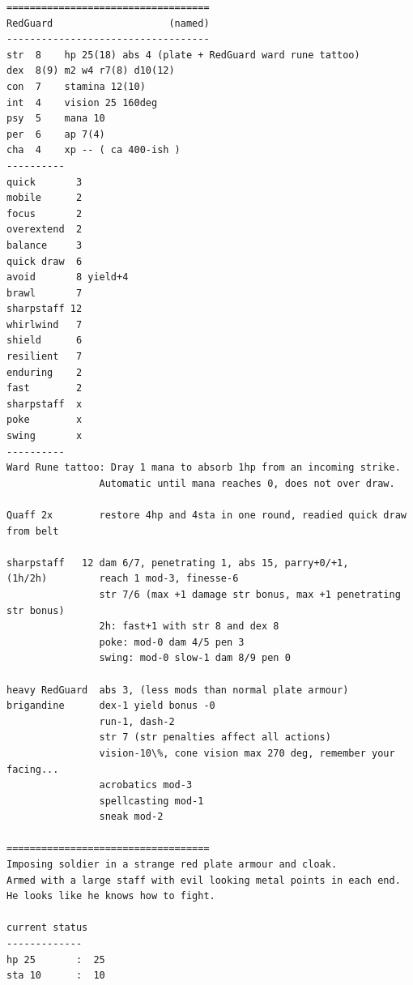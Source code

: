 \documentclass[11pt, twoside, titlepage, a4paper]{report}
\begin{document}
\small \begin{verbatim}
===================================
RedGuard                    (named)
-----------------------------------
str  8    hp 25(18) abs 4 (plate + RedGuard ward rune tattoo)
dex  8(9) m2 w4 r7(8) d10(12)
con  7    stamina 12(10)
int  4    vision 25 160deg
psy  5    mana 10
per  6    ap 7(4)
cha  4    xp -- ( ca 400-ish )
----------
quick       3
mobile      2
focus       2
overextend  2
balance     3
quick draw  6
avoid       8 yield+4
brawl       7
sharpstaff 12
whirlwind   7
shield      6
resilient   7
enduring    2
fast        2
sharpstaff  x
poke        x
swing       x
----------
Ward Rune tattoo: Dray 1 mana to absorb 1hp from an incoming strike.
                Automatic until mana reaches 0, does not over draw.

Quaff 2x        restore 4hp and 4sta in one round, readied quick draw from belt

sharpstaff   12 dam 6/7, penetrating 1, abs 15, parry+0/+1,
(1h/2h)         reach 1 mod-3, finesse-6
                str 7/6 (max +1 damage str bonus, max +1 penetrating str bonus)
                2h: fast+1 with str 8 and dex 8
                poke: mod-0 dam 4/5 pen 3
                swing: mod-0 slow-1 dam 8/9 pen 0

heavy RedGuard  abs 3, (less mods than normal plate armour)
brigandine      dex-1 yield bonus -0
                run-1, dash-2
                str 7 (str penalties affect all actions)
                vision-10\%, cone vision max 270 deg, remember your facing...
                acrobatics mod-3
                spellcasting mod-1
                sneak mod-2

===================================
Imposing soldier in a strange red plate armour and cloak.
Armed with a large staff with evil looking metal points in each end.
He looks like he knows how to fight.

current status
-------------
hp 25       :  25
sta 10      :  10




\end{verbatim}
\end{document}
